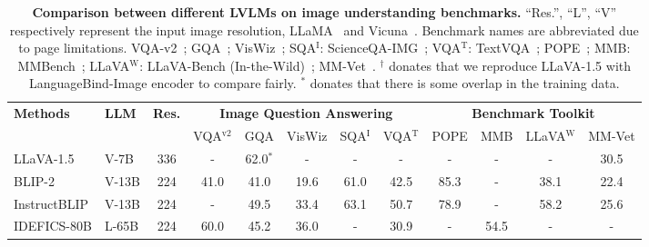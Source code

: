 \begin{table*}[t]
  \setlength\tabcolsep{1.0mm}
  \caption{\textbf{Comparison between different LVLMs on image understanding benchmarks.} ``Res.'', ``L'', ``V'' respectively represent the input image resolution, LLaMA~\cite{touvron2023llama} and Vicuna~\cite{chiang2023vicuna}. Benchmark names are abbreviated due to page limitations. VQA-v2~\cite{goyal2017making}; GQA~\cite{hudson2019gqa}; VisWiz~\cite{gurari2018vizwiz}; SQA$^\text{I}$: ScienceQA-IMG~\cite{lu2022learn}; VQA$^\text{T}$: TextVQA~\cite{singh2019towards}; POPE~\cite{li2023evaluating}; MMB: MMBench~\cite{liu2023mmbench}; LLaVA$^\text{W}$: LLaVA-Bench (In-the-Wild)~\cite{liu2023visual}; MM-Vet~\cite{yu2023mm}. $^\dag$ donates that we reproduce LLaVA-1.5 with LanguageBind-Image encoder to compare fairly. $^*$ donates that there is some overlap in the training data.}
  \label{tab:image_res}
  \centering
  \begin{tabular}{llc|ccccc|cccc}
    \toprule
     \multirow{2}{*}{\textbf{Methods}} & \multirow{2}{*}{\textbf{LLM}} & \multirow{2}{*}{\textbf{Res.}} & \multicolumn{5}{c|}{\textbf{Image Question Answering}} & \multicolumn{4}{c}{\textbf{Benchmark Toolkit}} \\
      &  &  & VQA$^\text{v2}$ & GQA & VisWiz & SQA$^\text{I}$ & VQA$^\text{T}$ & POPE & MMB & LLaVA$^\text{W}$ & MM-Vet \\
    \midrule
    \rowcolor{mygray} \color{gray} LLaVA-1.5 & \color{gray} V-7B & \color{gray} 336 & \color{gray} - & \color{gray} 62.0$^*$ & \color{gray} - & \color{gray} - & \color{gray} - & \color{gray} - & \color{gray} - & \color{gray} - & \color{gray} 30.5 \\
    \rowcolor{mygray} \color{gray} BLIP-2 & \color{gray} V-13B & \color{gray} 224 & \color{gray} 41.0 & \color{gray} 41.0 & \color{gray} 19.6 & \color{gray} 61.0 & \color{gray} 42.5 & \color{gray} 85.3 & \color{gray} - & \color{gray} 38.1 & \color{gray} 22.4 \\
    \rowcolor{mygray} \color{gray} InstructBLIP & \color{gray} V-13B & \color{gray} 224 & \color{gray} - & \color{gray} 49.5 & \color{gray} 33.4 & \color{gray} 63.1 & \color{gray} 50.7 & \color{gray} 78.9 & \color{gray} - & \color{gray} 58.2 & \color{gray} 25.6 \\
    \rowcolor{mygray} \color{gray} IDEFICS-80B & \color{gray} L-65B & \color{gray} 224 & \color{gray} 60.0 & \color{gray} 45.2 & \color{gray} 36.0 & \color{gray} - & \color{gray} 30.9 & \color{gray} - & \color{gray} 54.5 & \color{gray} - & \color{gray} - \\

\end{tabular}
\end{table*}

